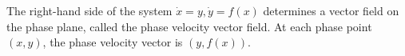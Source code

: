 The right-hand side of the system $\dot{x} = y, \dot{y} = f(x)$ determines a vector field on the phase plane, called the phase velocity vector field. At each phase point $(x, y)$, the phase velocity vector is $(y, f(x))$.

